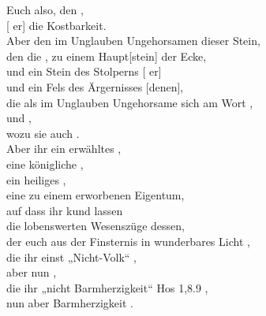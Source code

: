     Euch also, den , \\
        [ er] die Kostbarkeit. \\
        Aber den im Unglauben Ungehorsamen  dieser Stein, \\
        den die  , zu einem Haupt[stein] der Ecke, \\
        und ein Stein des Stolperns [ er] \\
        und ein Fels des Ärgernisses [denen], \\
            die als im Unglauben Ungehorsame sich am Wort , \\
             und , \\
            wozu sie auch . \\

    Aber ihr  ein erwähltes , \\
        eine königliche , \\
        ein heiliges , \\
        eine  zu einem erworbenen Eigentum, \\
        auf dass ihr kund  lassen  \\
        die lobenswerten Wesenszüge dessen, \\
            der euch aus der Finsternis in  wunderbares Licht , \\
            die ihr einst „Nicht-Volk“ , \\
            aber nun  , \\
                    die ihr „nicht Barmherzigkeit“ {Hos 1,8.9} , \\
                    nun aber Barmherzigkeit . \\

